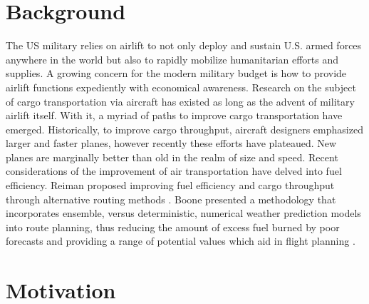 
\section{Background}
The US military relies on airlift to not only deploy and sustain U.S. armed forces anywhere in the world but also to rapidly mobilize humanitarian efforts and supplies.  A growing concern for the modern military budget is how to provide airlift functions expediently with economical awareness. Research on the subject of cargo transportation via aircraft has existed as long as the advent of military airlift itself. With it, a myriad of paths to improve cargo transportation have emerged.  Historically, to improve cargo throughput, aircraft designers emphasized larger and faster planes, however recently these efforts have plateaued.  New planes are marginally better than old in the realm of size and speed.  %
Recent considerations of the improvement of air transportation have delved into fuel efficiency. Reiman proposed improving fuel efficiency and cargo throughput through alternative routing methods \cite{Reiman2014}. Boone presented a methodology that incorporates ensemble, versus deterministic, numerical weather prediction models into route planning, thus reducing the
amount of excess fuel burned by poor forecasts and providing a range of potential values which aid in flight planning \cite{Boone2018}.    

\section{Motivation}


